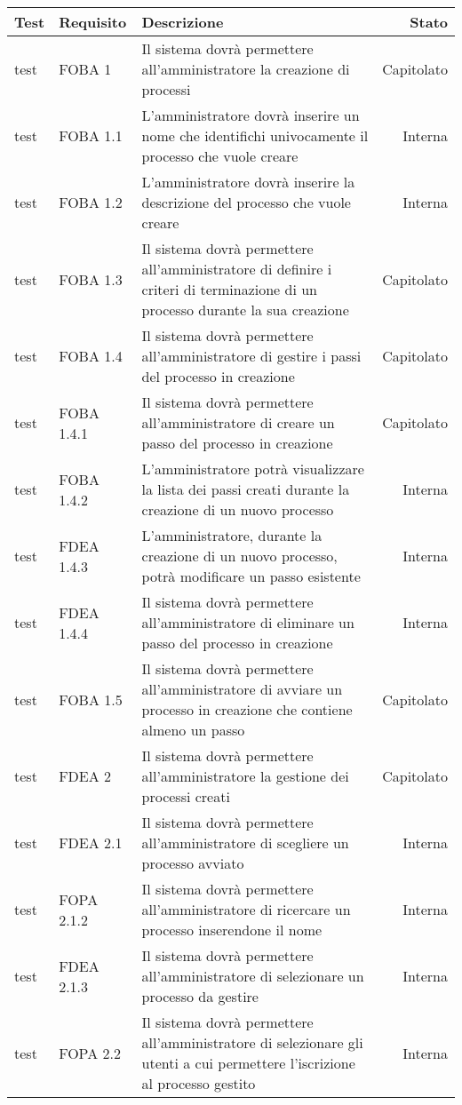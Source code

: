 \begin{longtable}{lXXr}%
\toprule
\textbf{Test} & \textbf{Requisito} & \textbf{Descrizione} & \textbf{Stato}\\
\toprule
test&FOBA 1&Il sistema dovrà permettere all'amministratore la creazione di processi&Capitolato\\
\midrule
test&FOBA 1.1&L'amministratore dovrà inserire un nome che identifichi univocamente il processo che vuole creare&Interna\\
\midrule
test&FOBA 1.2&L'amministratore dovrà inserire la descrizione del processo che vuole creare &Interna\\
\midrule
test&FOBA 1.3&Il sistema dovrà permettere all'amministratore di definire i criteri di terminazione di un processo durante la sua creazione&Capitolato\\
\midrule
test&FOBA 1.4&Il sistema dovrà permettere all'amministratore di gestire i passi del processo in creazione&Capitolato\\
test&FOBA 1.4.1&Il sistema dovrà permettere all'amministratore di creare un passo del processo in creazione&Capitolato\\
\midrule
test&FOBA 1.4.2&L'amministratore potrà visualizzare la lista dei passi creati durante la creazione di un nuovo processo&Interna\\
\midrule
test&FDEA 1.4.3&L'amministratore, durante la creazione di un nuovo processo, potrà modificare un passo esistente&Interna\\
\midrule
test&FDEA 1.4.4&Il sistema dovrà permettere all'amministratore di eliminare un passo del processo in creazione&Interna\\
\midrule
test&FOBA 1.5&Il sistema dovrà permettere all'amministratore di avviare un processo in creazione che contiene almeno un passo&Capitolato\\
\midrule
test&FDEA 2&Il sistema dovrà permettere all'amministratore la gestione dei processi creati&Capitolato\\
test&FDEA 2.1&Il sistema dovrà permettere all'amministratore di scegliere un processo avviato&Interna\\
\midrule
test&FOPA 2.1.2&Il sistema dovrà permettere all'amministratore di ricercare un processo inserendone il nome&Interna\\
\midrule
test&FDEA 2.1.3&Il sistema dovrà permettere all'amministratore di selezionare un processo da gestire&Interna\\
\midrule
test&FOPA 2.2&Il sistema dovrà permettere all'amministratore di selezionare gli utenti a cui permettere l'iscrizione al processo gestito&Interna\\

\end{longtable}

